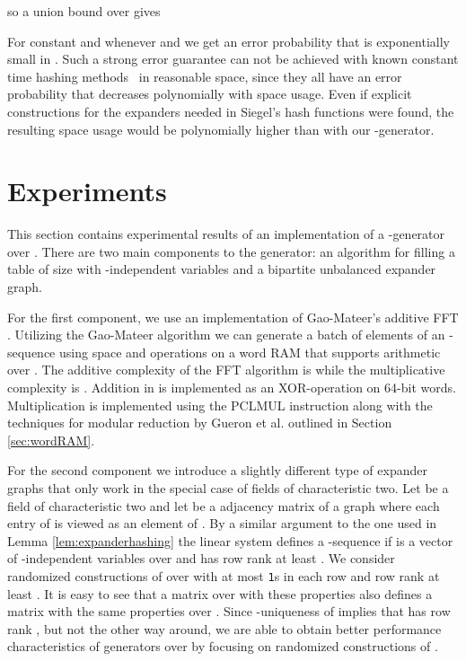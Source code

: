 \documentclass[a4paper,11pt]{article}
\theoremstyle{plain}
\theoremstyle{definition}
\begin{document}
so a union bound over  gives


For constant  and whenever  and  we get an error probability that is exponentially small in .
Such a strong error guarantee can not be achieved with known constant time hashing methods~\cite{siegel2004,pagh2008,dietzfelbinger2003,thorup2013} in reasonable space, since they all have an error probability that decreases polynomially with space usage.
Even if explicit constructions for the expanders needed in Siegel's hash functions were found, the resulting space usage would be polynomially higher than with our -generator.
\section{Experiments} \label{sec:experiments}
This section contains experimental results of an implementation of a -generator over . 
There are two main components to the generator: an algorithm for filling a table of size  with -independent variables and a bipartite unbalanced expander graph.

For the first component, we use an implementation of Gao-Mateer's additive FFT \cite[Algorithm 2.]{gao2010}.
Utilizing the Gao-Mateer algorithm we can generate a batch of  elements of an -sequence using space  and  operations on a word RAM that supports arithmetic over .
The additive complexity of the FFT algorithm is  while the multiplicative complexity is .
Addition in  is implemented as an XOR-operation on 64-bit words. 
Multiplication is implemented using the PCLMUL instruction along with the techniques for modular reduction by Gueron et
al. \cite{gueron2014} outlined in Section \ref{sec:wordRAM}.

For the second component we introduce a slightly different type of expander graphs that only work in the special case of
fields of characteristic two. 
Let  be a field of characteristic two and let  be a  adjacency matrix of a graph  where each entry of  is viewed as an element of .    
By a similar argument to the one used in Lemma \ref{lem:expanderhashing} the linear system  defines a -sequence if  is a vector of \mbox{-independent} variables over  and  has row rank at least .
We consider randomized constructions of  over  with at most  \texttt{1}s in each row and row rank at least .
It is easy to see that a matrix  over  with these properties also defines a matrix with the same properties over .
Since -uniqueness of  implies that  has row rank , but not the other way around, 
we are able to obtain better performance characteristics of generators over  by focusing on randomized constructions of .
\end{document}
